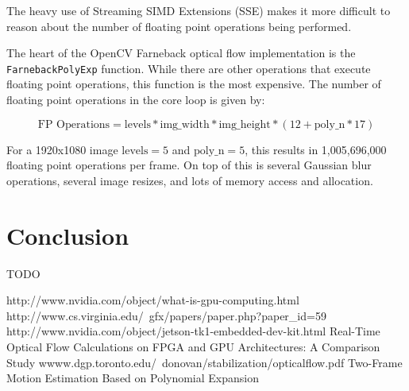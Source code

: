 \documentclass[12pt,letterpaper]{article}
\begin{document}
The heavy use of Streaming SIMD Extensions (SSE) makes it more difficult to
reason about the number of floating point operations being performed.

The heart of the OpenCV Farneback optical flow implementation is the
\texttt{FarnebackPolyExp} function. While there are other operations that
execute floating point operations, this function is the most expensive. The
number of floating point operations in the core loop is given by:

$$
\text{FP Operations} = \text{levels} * \text{img\_width} * \text{img\_height}
                * (12 + \text{poly\_n} * 17)
$$

For a 1920x1080 image $\text{levels}=5$ and $\text{poly\_n}=5$, this results in
1,005,696,000 floating point operations per frame. On top of this is several
Gaussian blur operations, several image resizes, and lots of memory access and
allocation.

\section{Conclusion}
TODO

\begin{thebibliography}{10}
    http://www.nvidia.com/object/what-is-gpu-computing.html
    http://www.cs.virginia.edu/~gfx/papers/paper.php?paper\_id=59
    http://www.nvidia.com/object/jetson-tk1-embedded-dev-kit.html
    Real-Time Optical Flow Calculations on FPGA and GPU Architectures: A Comparison
    Study
    wwww.dgp.toronto.edu/~donovan/stabilization/opticalflow.pdf
    Two-Frame Motion Estimation Based on Polynomial Expansion
\end{thebibliography}
\end{document}
